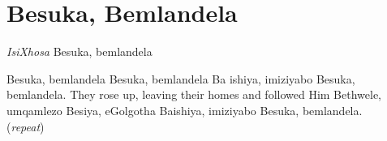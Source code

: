 \starttocol
\chapter{Besuka, Bemlandela}
\nexttocol
\hfill{\it IsiXhosa}
\stoptocol
\starttocol
\startlines
B{\sc esuka}, bemlandela

Besuka, bemlandela
Besuka, bemlandela
Ba ishiya, imiziyabo
Besuka, bemlandela. 
\stoplines
\nexttocol
They rose up, leaving their homes and followed Him
\stoptocol
\starttocol
\startlines
Bethwele, umqamlezo
Besiya, eGolgotha
Baishiya, imiziyabo
Besuka, bemlandela.   \hfill     ({\it repeat})~~~~~~~~~\hfill
\stoplines
\nexttocol
\stoptocol
